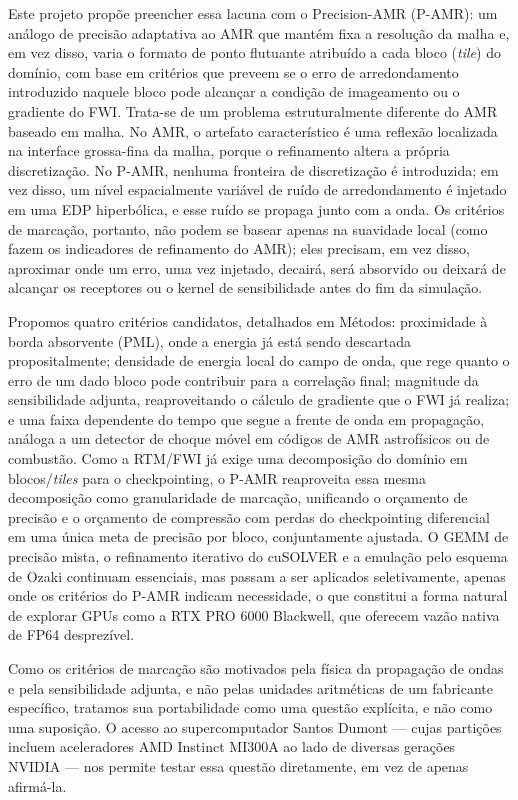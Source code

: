 \documentclass[12pt,a4paper]{article}
\newcommand{\pamr}{P\nobreakdash-AMR}
\begin{document}
Este projeto propõe preencher essa lacuna com o Precision-AMR (\pamr{}): um
análogo de precisão adaptativa ao AMR que mantém fixa a resolução da malha e,
em vez disso, varia o formato de ponto flutuante atribuído a cada bloco
(\emph{tile}) do domínio, com base em critérios que preveem se o erro de
arredondamento introduzido naquele bloco pode alcançar a condição de
imageamento ou o gradiente do FWI. Trata-se de um problema estruturalmente
diferente do AMR baseado em malha. No AMR, o artefato característico é uma
reflexão localizada na interface grossa-fina da malha, porque o refinamento
altera a própria discretização. No \pamr{}, nenhuma fronteira de discretização
é introduzida; em vez disso, um nível espacialmente variável de ruído de
arredondamento é injetado em uma EDP hiperbólica, e esse ruído se propaga
junto com a onda. Os critérios de marcação, portanto, não podem se basear
apenas na suavidade local (como fazem os indicadores de refinamento do AMR);
eles precisam, em vez disso, aproximar onde um erro, uma vez injetado,
decairá, será absorvido ou deixará de alcançar os receptores ou o kernel de
sensibilidade antes do fim da simulação.

Propomos quatro critérios candidatos, detalhados em Métodos: proximidade à
borda absorvente (PML), onde a energia já está sendo descartada
propositalmente; densidade de energia local do campo de onda, que rege quanto
o erro de um dado bloco pode contribuir para a correlação final; magnitude da
sensibilidade adjunta, reaproveitando o cálculo de gradiente que o FWI já
realiza; e uma faixa dependente do tempo que segue a frente de onda em
propagação, análoga a um detector de choque móvel em códigos de AMR
astrofísicos ou de combustão. Como a RTM/FWI já exige uma decomposição do
domínio em blocos/\emph{tiles} para o checkpointing, o \pamr{} reaproveita essa
mesma decomposição como granularidade de marcação, unificando o orçamento de
precisão e o orçamento de compressão com perdas do checkpointing diferencial
em uma única meta de precisão por bloco, conjuntamente ajustada. O GEMM de
precisão mista, o refinamento iterativo do cuSOLVER e a emulação pelo esquema
de Ozaki continuam essenciais, mas passam a ser aplicados seletivamente,
apenas onde os critérios do \pamr{} indicam necessidade, o que constitui a
forma natural de explorar GPUs como a RTX PRO 6000 Blackwell, que oferecem
vazão nativa de FP64 desprezível.

Como os critérios de marcação são motivados pela física da propagação de ondas
e pela sensibilidade adjunta, e não pelas unidades aritméticas de um
fabricante específico, tratamos sua portabilidade como uma questão explícita,
e não como uma suposição. O acesso ao supercomputador Santos Dumont --- cujas
partições incluem aceleradores AMD Instinct MI300A ao lado de diversas gerações
NVIDIA --- nos permite testar essa questão diretamente, em vez de apenas
afirmá-la.
\end{document}
